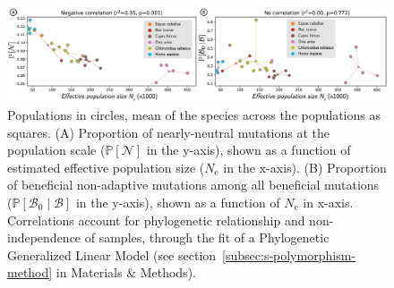 \documentclass{article}
\newcommand{\Ne}{N_{\text{e}}}
\newcommand{\proba}{\mathbb{P}}
\newcommand{\SphyBen}{\mathcal{B}_0}
\newcommand{\given}{\mid}
\newcommand{\SpopNeu}{\mathcal{N}}
\newcommand{\SpopBen}{\mathcal{B}}
\begin{document}
    \begin{figure}[!ht]
        \centering
        \includegraphics[width=\textwidth, page=1] {figure4.eps}
        \caption{
            Populations in circles, mean of the species across the populations as squares.
            (A) Proportion of nearly-neutral mutations at the population scale ($\proba [ \SpopNeu]$ in the y-axis), shown as a function of estimated effective population size ($\Ne$ in the x-axis).
            (B) Proportion of beneficial non-adaptive mutations among all beneficial mutations ($\proba [ \SphyBen \given \SpopBen]$ in the y-axis), shown as a function of $\Ne$ in x-axis.
            Correlations account for phylogenetic relationship and non-independence of samples, through the fit of a Phylogenetic Generalized Linear Model (see section~\ref{subsec:s-polymorphism-method} in Materials \& Methods).
        }
        \label{fig:diversity}
    \end{figure}
\end{document}
